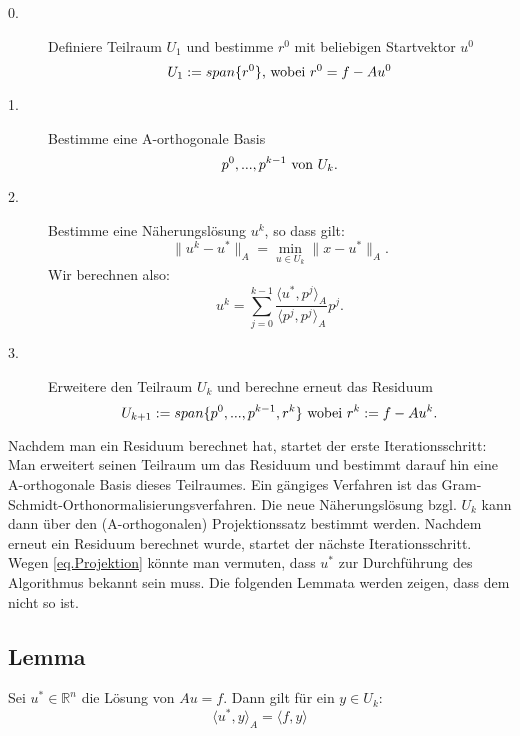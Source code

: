 \begin{description}

\item[0.] Definiere Teilraum $U_{1}$ und bestimme $r^{0}$ mit beliebigen Startvektor $u^{0}$
\begin{equation}
U_{1} := span\{r^{0}\} \textnormal{, wobei } r^{0} = f - Au^{0}
\end{equation}

\item[1.] Bestimme eine A-orthogonale Basis
\begin{equation}
p^{0},...,p^{k-1} \textnormal{ von } U_{k}.
\end{equation}

\item[2.] Bestimme eine Näherungslösung $u^{k}$, so dass gilt:
\begin{equation}
\|u^{k} - u^{*}\|_{A} = \underset{u \in U_{k}}{\min} \|x - u^{*}\|_{A}.
\end{equation}
Wir berechnen also:
\begin{equation}
u^{k} = \sum_{j=0}^{k-1} \frac {\langle u^{*}, p^{j} \rangle _{A}} {\langle p^{j}, p^{j} \rangle _{A}} p^{j}.\label{eq.Projektion}
\end{equation}

\item[3.] Erweitere den Teilraum $U_{k}$ und berechne erneut das Residuum
\begin{equation}
U_{k+1} := span\{p^{0},...,p^{k-1},r^{k}\} \textnormal{ wobei } r^{k} := f - Au^{k}.
\end{equation}

\end{description}

Nachdem man ein Residuum berechnet hat, startet der erste Iterationsschritt: Man erweitert seinen Teilraum um das Residuum und bestimmt darauf hin eine A-orthogonale Basis dieses Teilraumes. Ein gängiges Verfahren ist das Gram-Schmidt-Orthonormalisierungsverfahren. Die neue Näherungslösung bzgl. $U_{k}$ kann dann über den (A-orthogonalen) Projektionssatz bestimmt werden. Nachdem erneut ein Residuum berechnet wurde, startet der nächste Iterationsschritt.\\
Wegen \autoref{eq.Projektion} könnte man vermuten, dass $u^{*}$ zur Durchführung des Algorithmus bekannt sein muss. Die folgenden Lemmata werden zeigen, dass dem nicht so ist.

\subsection{Lemma}
Sei $u^{*} \in \mathbb{R}^{n}$ die Lösung von $Au = f$. Dann gilt für ein $y \in U_{k}$:
\begin{equation}
\langle u^{*}, y \rangle _{A} = \langle f, y \rangle
\end{equation}

